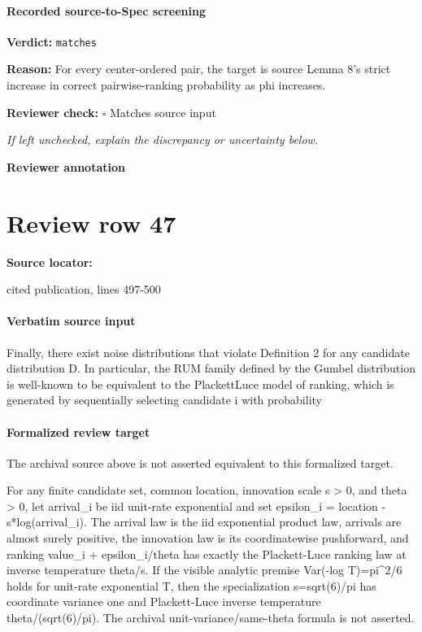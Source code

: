 \documentclass[10pt]{article}
\newcommand{\reviewerbox}{%
  \par\noindent\fbox{\parbox{0.96\linewidth}{\rule{0pt}{0.38in}}}\par
}
\newcommand{\reviewmatch}[1]{%
  \par\noindent\textbf{Reviewer check:} $\square$\; #1\par
  \noindent\emph{If left unchecked, explain the discrepancy or uncertainty below.}\par
}
\begin{document}
\paragraph{Recorded source-to-Spec screening}
\textbf{Verdict:} \texttt{matches}
\\
{\raggedright
\textbf{Reason:} For every center-\allowbreak{}ordered pair, the target is source Lemma 8's strict increase in correct pairwise-\allowbreak{}ranking probability as phi increases.\allowbreak{}
\par}
\reviewmatch{Matches source input}
\noindent\textbf{Reviewer annotation}\par
\reviewerbox
\clearpage
\hypertarget{source-claim-2d4c1840ef47dce5}{}
\section*{Review row 47}
\textbf{Source locator:} {\footnotesize\raggedright cited publication, lines 497-\allowbreak{}500\par}
\paragraph{Verbatim source input}
\begin{ReviewVerbatim}
Finally, there exist noise distributions that violate Definition 2 for any candidate distribution D. In
particular, the RUM family defined by the Gumbel distribution is well-known to be equivalent to the PlackettLuce model of ranking, which is generated by sequentially selecting candidate i with probability
\end{ReviewVerbatim}


\paragraph{Formalized review target}
The archival source above is not asserted equivalent to this formalized target.
\begin{ReviewVerbatim}
For any finite candidate set, common location, innovation scale s > 0, and theta > 0, let arrival_i be iid unit-rate exponential and set epsilon_i = location - s*log(arrival_i). The arrival law is the iid exponential product law, arrivals are almost surely positive, the innovation law is its coordinatewise pushforward, and ranking value_i + epsilon_i/theta has exactly the Plackett-Luce ranking law at inverse temperature theta/s. If the visible analytic premise Var(-log T)=pi^2/6 holds for unit-rate exponential T, then the specialization s=sqrt(6)/pi has coordinate variance one and Plackett-Luce inverse temperature theta/(sqrt(6)/pi). The archival unit-variance/same-theta formula is not asserted.
\end{ReviewVerbatim}
\end{document}
